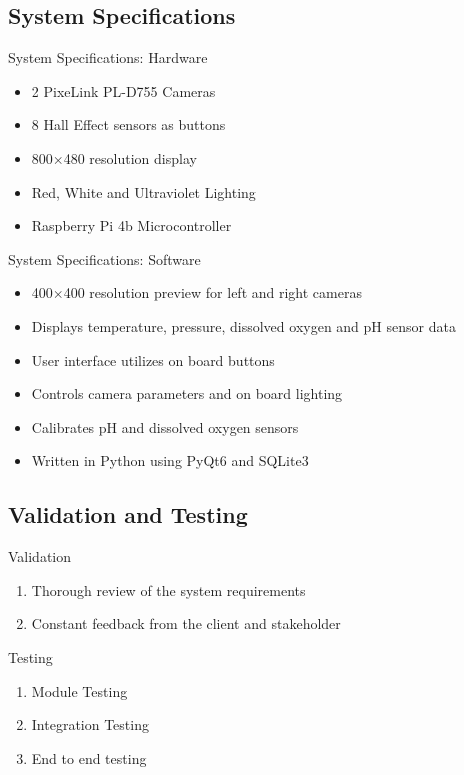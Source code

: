 \documentclass[17pt, aspectratio=169]{beamer}
\begin{document}
\subsection*{System Specifications}
\begin{frame}{System Specifications: Hardware}
	\begin{itemize}
		\item 2 PixeLink PL-D755 Cameras
		\item 8 Hall Effect sensors as buttons
		\item 800$\times$480 resolution display
		\item Red, White and Ultraviolet Lighting
		\item Raspberry Pi 4b Microcontroller
	\end{itemize}
\end{frame}
\begin{frame}{System Specifications: Software}
	\begin{itemize}
		\item 400$\times$400 resolution preview for left and right cameras
		\item Displays temperature, pressure, dissolved oxygen and pH sensor data
		\item User interface utilizes on board buttons
		\item Controls camera parameters and on board lighting
		\item Calibrates pH and dissolved oxygen sensors
		\item Written in Python using PyQt6 and SQLite3
	\end{itemize}
\end{frame}
\subsection*{Validation and Testing}
\begin{frame}{Validation}
	\begin{enumerate}
		\item Thorough review of the system requirements
		\item Constant feedback from the client and stakeholder
	\end{enumerate}
\end{frame}
\begin{frame}{Testing}
	\begin{enumerate}
		\item Module Testing
		\item Integration Testing
		\item End to end testing
	\end{enumerate}
\end{frame}
\end{document}
